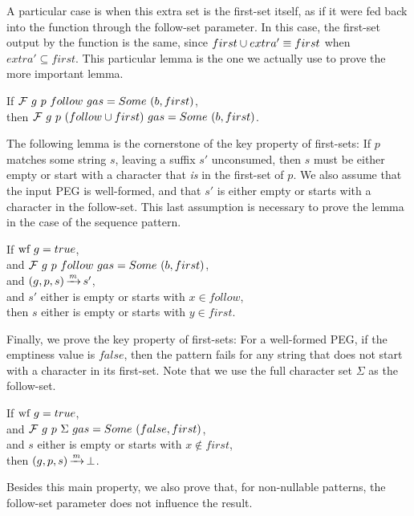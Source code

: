 A particular case
is when this extra set is the first-set itself,
as if it were fed back into the function
through the follow-set parameter.
In this case, the first-set output by the function is the same,
since $first \cup extra' \equiv first$ when $extra' \subseteq first$.
This particular lemma
is the one we actually use
to prove the more important lemma.

\begin{lemma}
If $\mathcal{F}{}\ g\ p\ follow\ gas = Some\ (b, first)$, \\
then $\mathcal{F}{}\ g\ p\ (follow \cup first)\ gas = Some\ (b, first)$.
\end{lemma}

The following lemma is the cornerstone of the key property of first-sets:
If $p$ matches some string $s$, leaving a suffix $s'$ unconsumed,
then $s$ must be either empty or start with a character
that \emph{is} in the first-set of $p$.
We also assume that the input PEG is well-formed,
and that $s'$ is either empty or starts with a character in the follow-set.
This last assumption is necessary to prove the lemma
in the case of the sequence pattern.

\begin{lemma}
If $\text{wf}\ g = true$, \\
and $\mathcal{F}{}\ g\ p\ follow\ gas = Some\ (b, first)$, \\
and $(g,p,s) \operatorname{\xrightarrow{\mathit{m}}} s'$, \\
and $s'$ either is empty or starts with $x \in follow$, \\
then $s$ either is empty or starts with $y \in first$.
\end{lemma}

Finally, we prove the key property of first-sets:
For a well-formed PEG,
if the emptiness value is $false$,
then the pattern fails for any string
that does not start with a character in its first-set.
Note that we use the full character set $\Sigma$ as the follow-set.

\begin{lemma}
If $\text{wf}\ g = true$, \\
and $\mathcal{F}{}\ g\ p\ \Sigma\ gas = Some\ (false, first)$, \\
and $s$ either is empty or starts with $x \notin first$, \\
then $(g,p,s) \operatorname{\xrightarrow{\mathit{m}}} \operatorname{\bot}$.
\end{lemma}

Besides this main property,
we also prove that, for non-nullable patterns,
the follow-set parameter does not influence the result.

